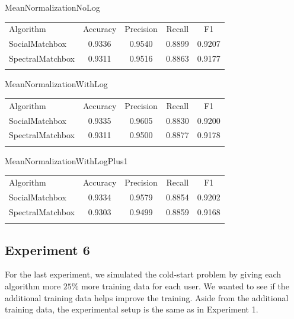 MeanNormalizationNoLog
\begin{table}
\begin{tabular}{ l  c  c  c  c }
\hline\noalign{\smallskip}
Algorithm & Accuracy & Precision & Recall & F1 \\
  \noalign{\smallskip}\hline\noalign{\smallskip}
SocialMatchbox & 0.9336 & 0.9540 & 0.8899 & 0.9207 \\
SpectralMatchbox & 0.9311 & 0.9516 & 0.8863 & 0.9177 \\
\noalign{\smallskip}\hline
\end{tabular} 
\end{table}

MeanNormalizationWithLog
\begin{table}
\begin{tabular}{ l  c  c  c  c }
\hline\noalign{\smallskip}
Algorithm & Accuracy & Precision & Recall & F1 \\
 \noalign{\smallskip}\hline\noalign{\smallskip}
SocialMatchbox & 0.9335 & 0.9605 & 0.8830 & 0.9200 \\
SpectralMatchbox & 0.9311 & 0.9500 & 0.8877 & 0.9178 \\
\noalign{\smallskip}\hline
\end{tabular} 
\end{table}

MeanNormalizationWithLogPlus1
\begin{table}
\begin{tabular}{l  c  c  c  c }
\hline\noalign{\smallskip}
Algorithm & Accuracy & Precision & Recall & F1 \\
  \noalign{\smallskip}\hline\noalign{\smallskip}
SocialMatchbox & 0.9334 & 0.9579 & 0.8854 & 0.9202 \\
SpectralMatchbox & 0.9303 & 0.9499 &  0.8859 & 0.9168 \\
\noalign{\smallskip}\hline
\end{tabular} 
\end{table}


\subsection{Experiment 6}
\label{sec:2}

For the last experiment, we simulated the cold-start problem by giving each algorithm more $25\%$ more training data for each user. We wanted to see if the additional training data helps improve the training. Aside from the additional training data, the experimental setup is the same as in Experiment 1.

